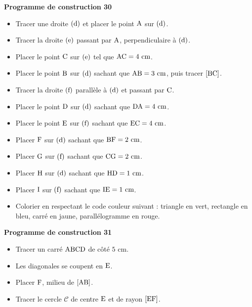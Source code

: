 \documentclass{article}
\begin{document}
\noindent\textbf{Programme de construction 30}\par\smallskip\noindent
\begin{itemize}
    \item Tracer une droite $(\text{d})$ et placer le point
    $\text{A}$ sur $(\text{d})$.
    \item Tracer la droite $(\text{e})$ passant par
    $\text{A}$, perpendiculaire à $(\text{d})$.
    \item Placer le point $\text{C}$ sur $(\text{e})$ tel que
    $\text{AC}=4\text{ cm}$.
    \item Placer le point $\text{B}$ sur $(\text{d})$ sachant
    que $\text{AB}=3\text{ cm}$, puis tracer $[\text{BC}]$.
    \item Tracer la droite $(\text{f})$ parallèle à
    $(\text{d})$ et passant par $\text{C}$.
    \item Placer le point $\text{D}$ sur $(\text{d})$ sachant
    que $\text{DA}=4\text{ cm}$.
    \item Placer le point $\text{E}$ sur $(\text{f})$ sachant
    que $\text{EC}=4\text{ cm}$.
    \item Placer $\text{F}$ sur $(\text{d})$ sachant que
    $\text{BF}=2\text{ cm}$.
    \item Placer $\text{G}$ sur $(\text{f})$ sachant que
    $\text{CG}=2\text{ cm}$.
    \item Placer $\text{H}$ sur $(\text{d})$ sachant que
    $\text{HD}=1\text{ cm}$.
    \item Placer $\text{I}$ sur $(\text{f})$ sachant que
    $\text{IE}=1\text{ cm}$.
    \item Colorier en respectant le code couleur suivant : triangle en
    vert, rectangle en bleu, carré en jaune, parallélogramme en rouge.
\end{itemize}
\noindent\textbf{Programme de construction 31}\par\smallskip\noindent
\begin{itemize}
    \item Tracer un carré $\text{ABCD}$ de côté $5\text{ cm}$.
    \item Les diagonales se coupent en $\text{E}$.
    \item Placer $\text{F}$, milieu de $[\text{AB}]$.
    \item Tracer le cercle $\mathcal{C}$ de centre $\text{E}$ et de
    rayon $[\text{EF}]$.
\end{itemize}
\end{document}
